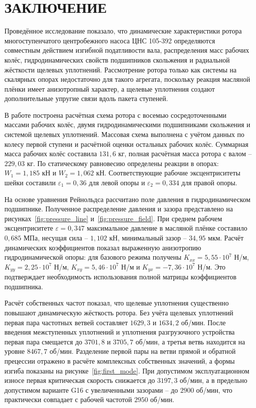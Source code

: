 \newpage
{}
{}
\section*{ЗАКЛЮЧЕНИЕ}

Проведённое исследование показало, что динамические характеристики ротора многоступенчатого центробежного насоса ЦНС 105-392 определяются совместным действием изгибной податливости вала, распределения масс рабочих колёс, гидродинамических свойств подшипников скольжения и радиальной жёсткости щелевых уплотнений. Рассмотрение ротора только как системы на скалярных опорах недостаточно для такого агрегата, поскольку реакция масляной плёнки имеет анизотропный характер, а щелевые уплотнения создают дополнительные упругие связи вдоль пакета ступеней.

В работе построена расчётная схема ротора с восемью сосредоточенными массами рабочих колёс, двумя гидродинамическими подшипниками скольжения и системой щелевых уплотнений. Массовая схема выполнена с учётом данных по колесу первой ступени и расчётной оценки остальных рабочих колёс. Суммарная масса рабочих колёс составила $131{,}6$ кг, полная расчётная масса ротора с валом -- $229{,}03$ кг. По статическому равновесию определены реакции в опорах: $W_1=1{,}185$ кН и $W_2=1{,}062$ кН. Соответствующие рабочие эксцентриситеты шейки составили $\varepsilon_1=0{,}36$ для левой опоры и $\varepsilon_2=0{,}334$ для правой опоры.

На основе уравнения Рейнольдса рассчитано поле давления в гидродинамическом подшипнике. Полученное распределение давления и зазора представлено на рисунках~\ref{fig:pressure_line} и~\ref{fig:pressure_field}. При среднем рабочем эксцентриситете $\varepsilon=0{,}347$ максимальное давление в масляной плёнке составило $0{,}685$ МПа, несущая сила -- $1{,}102$ кН, минимальный зазор -- $34{,}95$ мкм. Расчёт динамических коэффициентов показал выраженную анизотропию гидродинамической опоры: для базового режима получены $K_{xx}=5{,}55\cdot10^7$ Н/м, $K_{yy}=2{,}25\cdot10^7$ Н/м, $K_{xy}=5{,}46\cdot10^7$ Н/м и $K_{yx}=-7{,}36\cdot10^7$ Н/м. Это подтверждает необходимость использования полной матрицы коэффициентов подшипника.

Расчёт собственных частот показал, что щелевые уплотнения существенно повышают динамическую жёсткость ротора. Без учёта щелевых уплотнений первая пара частотных ветвей составляет $1629{,}3$ и $1634{,}2$ об/мин. После введения межступенных уплотнений и уплотнения разгрузочного устройства первая пара смещается до $3701{,}8$ и $3705{,}7$ об/мин, а третья ветвь находится на уровне $8467{,}7$ об/мин. Разделение первой пары на ветви прямой и обратной прецессии отражено в расчёте комплексных собственных значений, а формы изгиба показаны на рисунке~\ref{fig:first_mode}. При допустимом эксплуатационном износе первая критическая скорость снижается до $3197{,}3$ об/мин, а в предельно допустимом варианте G16 с увеличенными зазорами -- до $2900$ об/мин, что практически совпадает с рабочей частотой $2950$ об/мин.

